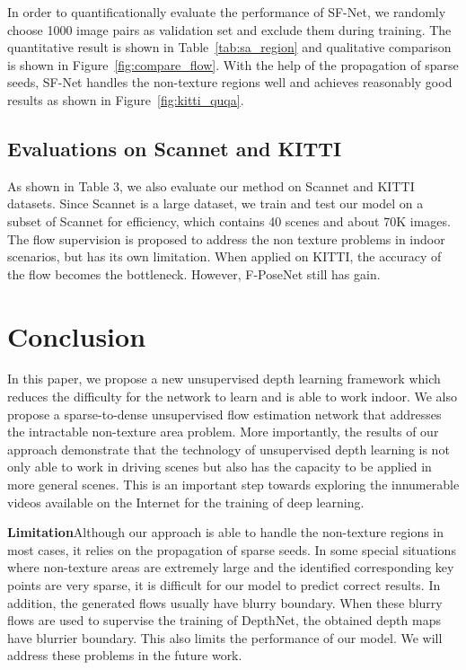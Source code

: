 \documentclass[10pt,twocolumn,letterpaper]{article}
\begin{document}
In order to quantificationally evaluate the performance of SF-Net, we randomly choose 1000 image pairs as validation set and exclude them during training. The quantitative result is shown in Table~\ref{tab:sa_region} and qualitative comparison is shown in Figure~\ref{fig:compare_flow}. With the help of the propagation of sparse seeds, SF-Net handles the non-texture regions well and achieves reasonably good results as shown in Figure~\ref{fig:kitti_quqa}.

\vspace{-1mm}
\subsection{Evaluations on Scannet and KITTI}

As shown in Table 3, we also evaluate our method on Scannet and KITTI datasets. Since Scannet is a large dataset, we train and test our model on a subset of Scannet for efficiency, which contains 40 scenes and about 70K images. The flow supervision is proposed to address the non texture problems in indoor scenarios, but has its own limitation. When applied on KITTI, the accuracy of the flow becomes the bottleneck.  However, F-PoseNet still has gain.

\section{Conclusion}

In this paper, we propose a new unsupervised depth learning framework which reduces the difficulty for the network to learn and is able to work indoor. We also propose a sparse-to-dense unsupervised flow estimation network that addresses the intractable non-texture area problem. More importantly, the results of our approach demonstrate that the technology of unsupervised depth learning is not only able to work in driving scenes but also has the capacity to be applied in more general scenes. This is an important step towards exploring the innumerable videos available on the Internet for the training of deep learning.

\textbf{Limitation}\quad Although our approach is able to handle the non-texture regions in most cases, it relies on the propagation of sparse seeds. In some special situations where non-texture areas are extremely large and the identified corresponding key points are very sparse, it is difficult for our model to predict correct results. In addition, the generated flows usually have blurry boundary. When these blurry flows are used to supervise the training of DepthNet, the obtained depth maps have blurrier boundary. This also limits the performance of our model.
We will address these problems in the future work.
{\small


}
\end{document}
